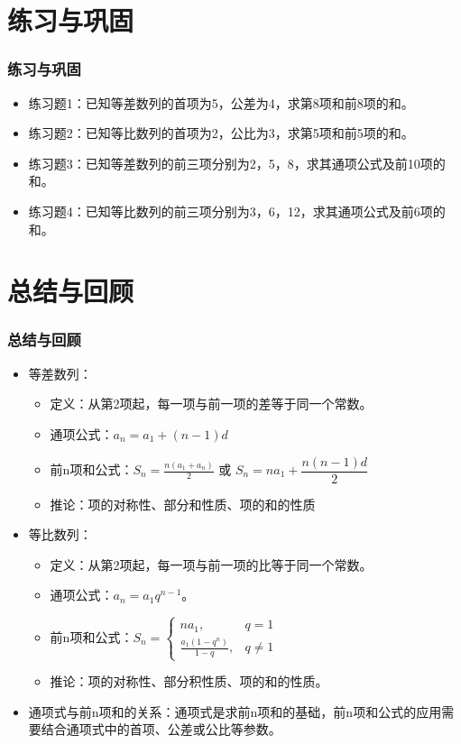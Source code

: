 \documentclass{ctexbeamer}
\begin{document}
\section{练习与巩固}
\begin{frame}
\frametitle{练习与巩固}
\begin{itemize}
    \item 练习题1：已知等差数列的首项为5，公差为4，求第8项和前8项的和。
    \item 练习题2：已知等比数列的首项为2，公比为3，求第5项和前5项的和。
    \item 练习题3：已知等差数列的前三项分别为2，5，8，求其通项公式及前10项的和。
    \item 练习题4：已知等比数列的前三项分别为3，6，12，求其通项公式及前6项的和。
\end{itemize}
\end{frame}

\section{总结与回顾}
\begin{frame}
\frametitle{总结与回顾}
\begin{itemize}
    \item 等差数列：
        \begin{itemize}
            \item 定义：从第2项起，每一项与前一项的差等于同一个常数。
            \item 通项公式：$a_n = a_1 + (n - 1)d$
            \item 前n项和公式：$S_n = \frac{n(a_1 + a_n)}{2}$ 或 $S_n = na_1 + \dfrac{n(n - 1)d}{2}$
            \item 推论：项的对称性、部分和性质、项的和的性质
        \end{itemize}
    \item 等比数列：
        \begin{itemize}
            \item 定义：从第2项起，每一项与前一项的比等于同一个常数。
            \item 通项公式：$a_n = a_1q^{n-1}$。
            \item 前n项和公式：$S_n = \begin{cases}
                na_1, & q = 1 \\
                \frac{a_1(1 - q^n)}{1 - q}, & q \neq 1
            \end{cases}$
            \item 推论：项的对称性、部分积性质、项的和的性质。
        \end{itemize}
    \item 通项式与前n项和的关系：通项式是求前n项和的基础，前n项和公式的应用需要结合通项式中的首项、公差或公比等参数。
\end{itemize}
\end{frame}
\end{document}

